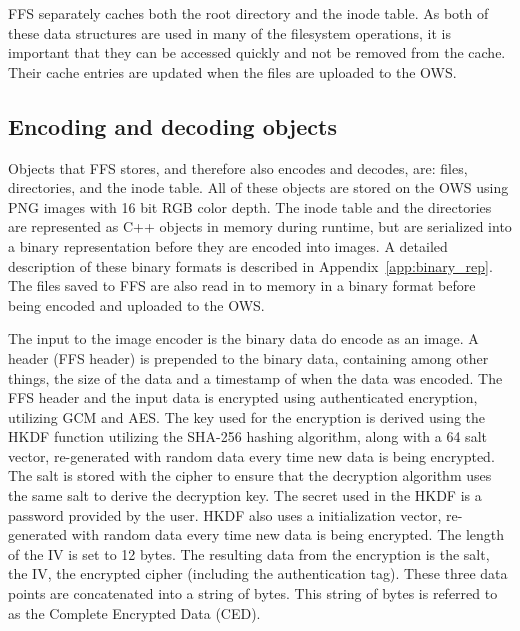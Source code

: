 FFS separately caches both the root directory and the inode table. As both of these data structures are used in many of the filesystem operations, it is important that they can be accessed quickly and not be removed from the cache. Their cache entries are updated when the files are uploaded to the OWS.

\subsection{Encoding and decoding objects}
\label{subsec:file_enc_dec}
Objects that FFS stores, and therefore also encodes and decodes, are: files, directories, and the inode table. All of these objects are stored on the OWS using PNG images with 16 bit RGB color depth. The inode table and the directories are represented as C++ objects in memory during runtime, but are serialized into a binary representation before they are encoded into images. A detailed description of these binary formats is described in Appendix~\ref{app:binary_rep}. The files saved to FFS are also read in to memory in a binary format before being encoded and uploaded to the OWS. 

The input to the image encoder is the binary data do encode as an image. A header (FFS header) is prepended to the binary data, containing among other things, the size of the data and a timestamp of when the data was encoded. The FFS header and the input data is encrypted using authenticated encryption, utilizing GCM and AES. The key used for the encryption is derived using the HKDF function utilizing the SHA-256 hashing algorithm, along with a \SI{64}{\byte} salt vector, re-generated with random data every time new data is being encrypted. The salt is stored with the cipher to ensure that the decryption algorithm uses the same salt to derive the decryption key. The secret used in the HKDF is a password provided by the user. HKDF also uses a initialization vector, re-generated with random data every time new data is being encrypted. The length of the IV is set to 12 bytes. The resulting data from the encryption is the salt, the IV, the encrypted cipher (including the authentication tag). These three data points are concatenated into a string of bytes. This string of bytes is referred to as the Complete Encrypted Data (\gls{CED}).


